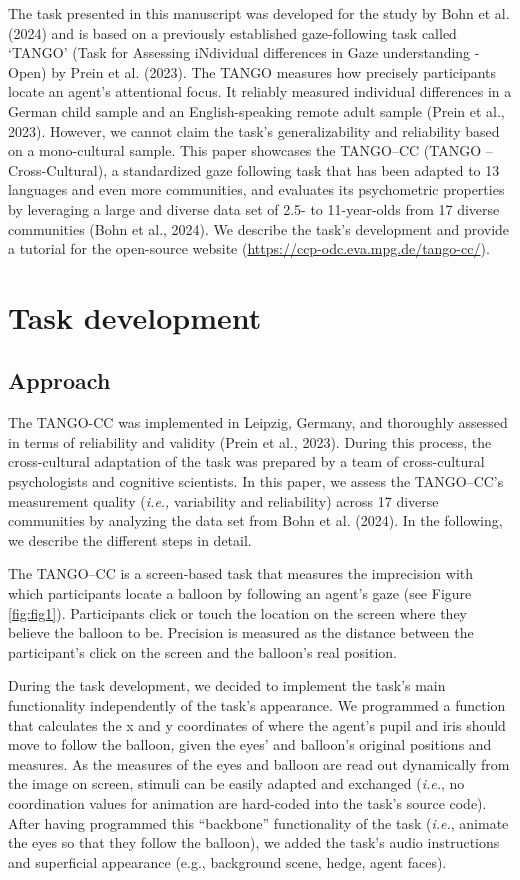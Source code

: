 \documentclass[
  man,floatsintext]{apa7}
\begin{document}
The task presented in this manuscript was developed for the study by Bohn et al. (2024) and is based on a previously established gaze-following task called `TANGO' (Task for Assessing iNdividual differences in Gaze understanding - Open) by Prein et al. (2023).
The TANGO measures how precisely participants locate an agent's attentional focus.
It reliably measured individual differences in a German child sample and an English-speaking remote adult sample (Prein et al., 2023).
However, we cannot claim the task's generalizability and reliability based on a mono-cultural sample.
This paper showcases the TANGO--CC (TANGO -- Cross-Cultural), a standardized gaze following task that has been adapted to 13 languages and even more communities, and evaluates its psychometric properties by leveraging a large and diverse data set of 2.5- to 11-year-olds from 17 diverse communities (Bohn et al., 2024).
We describe the task's development and provide a tutorial for the open-source website (\url{https://ccp-odc.eva.mpg.de/tango-cc/}).

\section{Task development}\label{task-development}

\subsection{Approach}\label{approach}

The TANGO-CC was implemented in Leipzig, Germany, and thoroughly assessed in terms of reliability and validity (Prein et al., 2023).
During this process, the cross-cultural adaptation of the task was prepared by a team of cross-cultural psychologists and cognitive scientists.
In this paper, we assess the TANGO--CC's measurement quality (\emph{i.e.,} variability and reliability) across 17 diverse communities by analyzing the data set from Bohn et al. (2024).
In the following, we describe the different steps in detail.

The TANGO--CC is a screen-based task that measures the imprecision with which participants locate a balloon by following an agent's gaze (see Figure \ref{fig:fig1}).
Participants click or touch the location on the screen where they believe the balloon to be.
Precision is measured as the distance between the participant's click on the screen and the balloon's real position.

During the task development, we decided to implement the task's main functionality independently of the task's appearance.
We programmed a function that calculates the x and y coordinates of where the agent's pupil and iris should move to follow the balloon, given the eyes' and balloon's original positions and measures.
As the measures of the eyes and balloon are read out dynamically from the image on screen, stimuli can be easily adapted and exchanged (\emph{i.e.}, no coordination values for animation are hard-coded into the task's source code).
After having programmed this ``backbone'' functionality of the task (\emph{i.e.}, animate the eyes so that they follow the balloon), we added the task's audio instructions and superficial appearance (e.g., background scene, hedge, agent faces).
\end{document}
